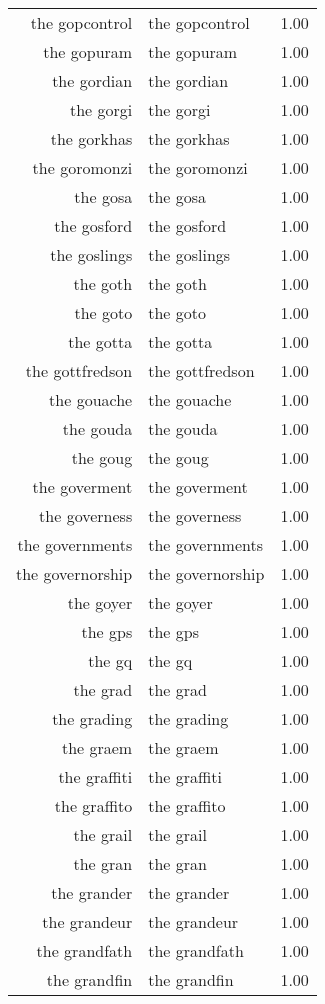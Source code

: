 \begin{table}[ht]
\begin{tabular}{rlr}
  the gopcontrol & the gopcontrol & 1.00 \\ 
  the gopuram & the gopuram & 1.00 \\ 
  the gordian & the gordian & 1.00 \\ 
  the gorgi & the gorgi & 1.00 \\ 
  the gorkhas & the gorkhas & 1.00 \\ 
  the goromonzi & the goromonzi & 1.00 \\ 
  the gosa & the gosa & 1.00 \\ 
  the gosford & the gosford & 1.00 \\ 
  the goslings & the goslings & 1.00 \\ 
  the goth & the goth & 1.00 \\ 
  the goto & the goto & 1.00 \\ 
  the gotta & the gotta & 1.00 \\ 
  the gottfredson & the gottfredson & 1.00 \\ 
  the gouache & the gouache & 1.00 \\ 
  the gouda & the gouda & 1.00 \\ 
  the goug & the goug & 1.00 \\ 
  the goverment & the goverment & 1.00 \\ 
  the governess & the governess & 1.00 \\ 
  the governments & the governments & 1.00 \\ 
  the governorship & the governorship & 1.00 \\ 
  the goyer & the goyer & 1.00 \\ 
  the gps & the gps & 1.00 \\ 
  the gq & the gq & 1.00 \\ 
  the grad & the grad & 1.00 \\ 
  the grading & the grading & 1.00 \\ 
  the graem & the graem & 1.00 \\ 
  the graffiti & the graffiti & 1.00 \\ 
  the graffito & the graffito & 1.00 \\ 
  the grail & the grail & 1.00 \\ 
  the gran & the gran & 1.00 \\ 
  the grander & the grander & 1.00 \\ 
  the grandeur & the grandeur & 1.00 \\ 
  the grandfath & the grandfath & 1.00 \\ 
  the grandfin & the grandfin & 1.00 \\ 

\end{tabular}
\end{table}
